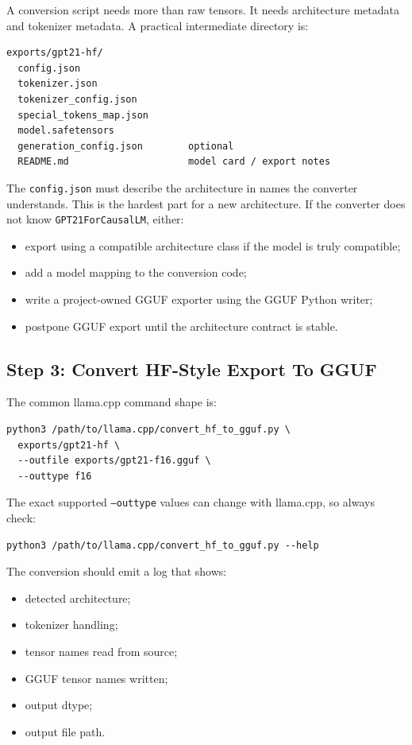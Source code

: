 A conversion script needs more than raw tensors. It needs architecture metadata and
tokenizer metadata. A practical intermediate directory is:

\begin{lstlisting}
exports/gpt21-hf/
  config.json
  tokenizer.json
  tokenizer_config.json
  special_tokens_map.json
  model.safetensors
  generation_config.json        optional
  README.md                     model card / export notes
\end{lstlisting}

The \texttt{config.json} must describe the architecture in names the converter
understands. This is the hardest part for a new architecture. If the converter does not
know \texttt{GPT21ForCausalLM}, either:

\begin{itemize}
  \item export using a compatible architecture class if the model is truly compatible;
  \item add a model mapping to the conversion code;
  \item write a project-owned GGUF exporter using the GGUF Python writer;
  \item postpone GGUF export until the architecture contract is stable.
\end{itemize}

\subsection{Step 3: Convert HF-Style Export To GGUF}

The common llama.cpp command shape is:

\begin{lstlisting}
python3 /path/to/llama.cpp/convert_hf_to_gguf.py \
  exports/gpt21-hf \
  --outfile exports/gpt21-f16.gguf \
  --outtype f16
\end{lstlisting}

The exact supported \texttt{--outtype} values can change with llama.cpp, so always check:

\begin{lstlisting}
python3 /path/to/llama.cpp/convert_hf_to_gguf.py --help
\end{lstlisting}

The conversion should emit a log that shows:

\begin{itemize}
  \item detected architecture;
  \item tokenizer handling;
  \item tensor names read from source;
  \item GGUF tensor names written;
  \item output dtype;
  \item output file path.
\end{itemize}

